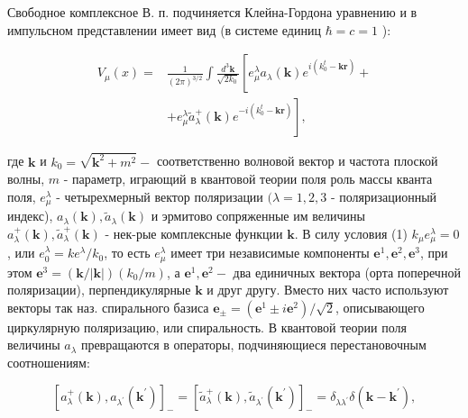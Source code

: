 \documentclass[10pt]{article}
\begin{document}
Свободное комплексное В. п. подчиняется Клейна-Гордона уравнению и в импульсном представлении имеет вид (в системе единиц $\hbar=c=1$ ):



\[

\begin{aligned}

V_{\mu}(x)= & \frac{1}{(2 \pi)^{3 / 2}} \int \frac{d^{3} \boldsymbol{k}}{\sqrt{2 k_{0}}}\left[e_{\mu}^{\lambda} a_{\lambda}(\boldsymbol{k}) e^{i\left(k_{0}^{t}-\boldsymbol{k r}\right)}+\right. \\

& \left.+e_{\mu}^{\lambda} \tilde{a}_{\lambda}^{+}(\boldsymbol{k}) e^{-i\left(k_{0}^{t}-\boldsymbol{k r}\right)}\right],

\end{aligned}

\]



где $\boldsymbol{k}$ и $k_{0}=\sqrt{\boldsymbol{k}^{2}+m^{2}}-$ соответственно волновой вектор и частота плоской волны, $m$ - параметр, играющий в квантовой теории поля роль массы кванта поля, $e_{\mu}^{\lambda}$ - четырехмерный вектор поляризации $(\lambda=1,2,3$ - поляризационный индекс), $a_{\lambda}(\boldsymbol{k}), \tilde{a}_{\lambda}(\boldsymbol{k})$ и эрмитово сопряженные им величины $a_{\lambda}^{+}(\boldsymbol{k}), \tilde{a}_{\lambda}^{+}(\boldsymbol{k})$ - нек-рые комплексные функции $\boldsymbol{k}$. В силу условия (1) $k_{\mu} e_{\mu}^{\lambda}=0$, или $e_{0}^{\lambda}=k e^{\lambda} / k_{0}$, то есть $e_{\mu}^{\lambda}$ имеет три независимые компоненты $\boldsymbol{e}^{1}, \boldsymbol{e}^{2}, \boldsymbol{e}^{3}$, при этом $\boldsymbol{e}^{3}=(\boldsymbol{k} /|\boldsymbol{k}|)\left(k_{0} / m\right)$, а $\boldsymbol{e}^{1}, \boldsymbol{e}^{2}-$ два единичных вектора (орта поперечной поляризации), перпендикулярные $\boldsymbol{k}$ и друг другу. Вместо них часто используют векторы так наз. спирального базиса $\boldsymbol{e}_{ \pm}=\left(\boldsymbol{e}^{1} \pm i \boldsymbol{e}^{2}\right) / \sqrt{2}$, описывающего циркулярную поляризацию, или спиральность. В квантовой теории поля величины $a_{\lambda}$ превращаются в операторы, подчиняющиеся перестановочным соотношениям:



\[

\left[a_{\lambda}^{+}(\boldsymbol{k}), a_{\lambda^{\prime}}\left(\boldsymbol{k}^{\prime}\right)\right]_{-}=\left[\tilde{a}_{\lambda}^{+}(\boldsymbol{k}), \tilde{a}_{\lambda^{\prime}}\left(\boldsymbol{k}^{\prime}\right)\right]_{-}=\delta_{\lambda \lambda^{\prime}} \delta\left(\boldsymbol{k}-\boldsymbol{k}^{\prime}\right),

\]
\end{document}
